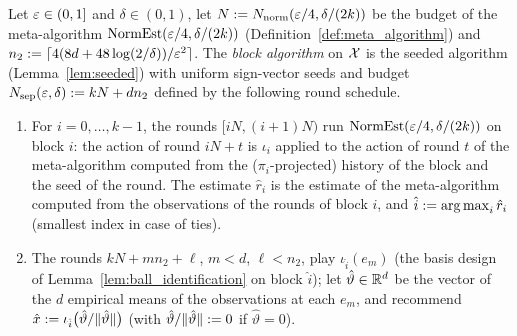 \begin{definition}\label{def:block_algorithm}
\leanok
{}
Let $\varepsilon \in (0,1]$ and $\delta \in (0,1)$, let $N := N_{\mathrm{norm}}(\varepsilon/4, \delta/(2k))$ be
the budget of the meta-algorithm $\mathrm{NormEst}(\varepsilon/4, \delta/(2k))$
(Definition~\ref{def:meta_algorithm}) and $n_2 := \lceil 4(8d + 48\log(2/\delta))/\varepsilon^2 \rceil$.
The \emph{block algorithm} on $\mathcal{X}$ is the seeded algorithm (Lemma~\ref{lem:seeded}) with
uniform sign-vector seeds and budget $N_{\mathrm{sep}}(\varepsilon,\delta) := kN + dn_2$ defined by the
following round schedule.
\begin{enumerate}
  \item[(1)] For $i = 0, \dots, k-1$, the rounds $[iN, (i+1)N)$ run
        $\mathrm{NormEst}(\varepsilon/4, \delta/(2k))$ on block $i$: the action of round $iN + t$ is
        $\iota_i$ applied to the action of round $t$ of the meta-algorithm computed from the
        ($\pi_i$-projected) history of the block and the seed of the round. The estimate
        $\hat r_i$ is the estimate of the meta-algorithm computed from the observations of the
        rounds of block $i$, and $\hat i := \operatorname*{arg\,max}_i\hat r_i$ (smallest index in case of ties).
  \item[(2)] The rounds $kN + mn_2 + \ell$, $m < d$, $\ell < n_2$, play $\iota_{\hat i}(e_m)$
        (the basis design of Lemma~\ref{lem:ball_identification} on block $\hat i$); let
        $\hat\vartheta \in \mathbb{R}^d$ be the vector of the $d$ empirical means of the observations
        at each $e_m$, and recommend $\hat{x} := \iota_{\hat i}\big(\hat\vartheta/\lVert \hat\vartheta \rVert\big)$
        (with $\hat\vartheta/\lVert \hat\vartheta \rVert := 0$ if $\hat\vartheta = 0$).
\end{enumerate}
\end{definition}

